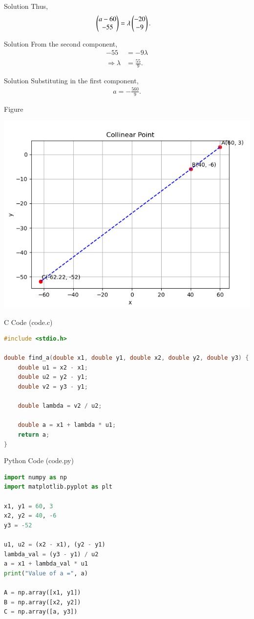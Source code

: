 \documentclass{beamer}
\begin{document}
\begin{frame}{Solution}
Thus,
\begin{align}
\begin{pmatrix}a-60 \\ -55\end{pmatrix} &= \lambda \begin{pmatrix}-20 \\ -9\end{pmatrix}.
\end{align}
\end{frame}
\begin{frame}{Solution}
From the second component,
\begin{align}
-55 &= -9\lambda \\
\Rightarrow \lambda &= \frac{55}{9}.
\end{align}
\end{frame}
\begin{frame}{Solution}
Substituting in the first component,
\begin{align}
a = -\frac{560}{9}.
\end{align}
\end{frame}
\begin{frame}{Figure}
\begin{center}
\includegraphics[width=0.6\columnwidth]{figs/fig.png}
\end{center}
\end{frame}
\begin{frame}[fragile]{C Code (code.c)}
\begin{lstlisting}[language=C]
#include <stdio.h>

double find_a(double x1, double y1, double x2, double y2, double y3) {
    double u1 = x2 - x1;
    double u2 = y2 - y1;
    double v2 = y3 - y1;

    double lambda = v2 / u2;

    double a = x1 + lambda * u1;
    return a;
}
\end{lstlisting}
\end{frame}
\begin{frame}[fragile]{Python Code (code.py)}
\begin{lstlisting}[language=Python]
import numpy as np
import matplotlib.pyplot as plt

x1, y1 = 60, 3
x2, y2 = 40, -6
y3 = -52

u1, u2 = (x2 - x1), (y2 - y1)
lambda_val = (y3 - y1) / u2
a = x1 + lambda_val * u1
print("Value of a =", a)

A = np.array([x1, y1])
B = np.array([x2, y2])
C = np.array([a, y3])

\end{lstlisting}
\end{frame}
\end{document}

